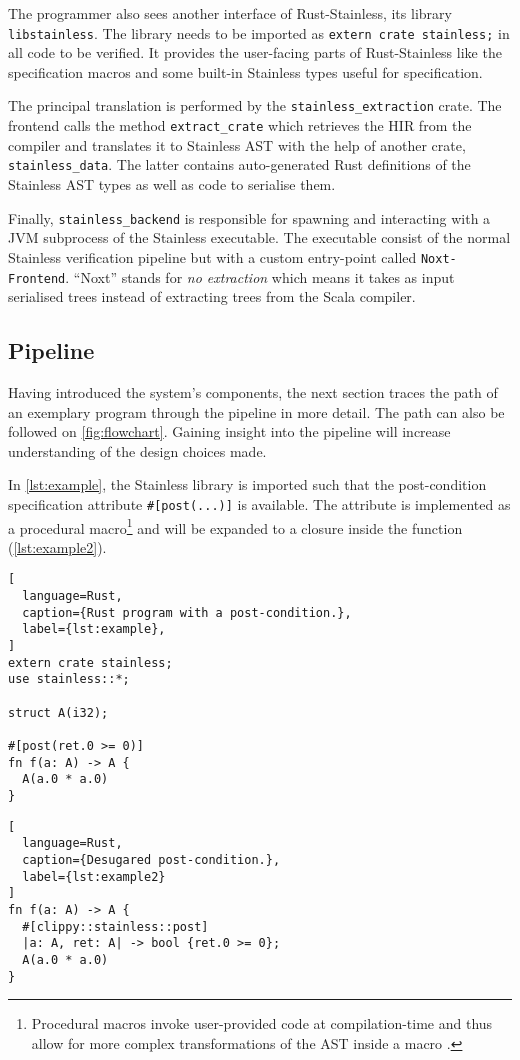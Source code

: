 The programmer also sees another interface of Rust-Stainless, its library
\lstinline!libstainless!. The library needs to be imported as
\passthrough{\lstinline!extern crate stainless;!} in all code to be verified. It
provides the user-facing parts of Rust-Stainless like the specification macros
and some built-in Stainless types useful for specification.

The principal translation is performed by the \lstinline!stainless_extraction!
crate. The frontend calls the method \lstinline!extract_crate! which retrieves
the HIR from the compiler and translates it to Stainless AST with the help of
another crate, \lstinline!stainless_data!. The latter contains auto-generated
Rust definitions of the Stainless AST types as well as code to serialise them.

Finally, \lstinline!stainless_backend! is responsible for spawning and
interacting with a JVM subprocess of the Stainless executable. The executable
consist of the normal Stainless verification pipeline but with a custom
entry-point called \lstinline!Noxt-Frontend!. ``Noxt'' stands for \emph{no
extraction} which means it takes as input serialised trees instead of extracting
trees from the Scala compiler.

\subsection{Pipeline}
\label{sec:pipeline}

Having introduced the system's components, the next section traces the path of
an exemplary program through the pipeline in more detail. The path can also be
followed on \autoref{fig:flowchart}. Gaining insight into the pipeline will
increase understanding of the design choices made.

In \autoref{lst:example}, the Stainless library is imported such that the
post-condition specification attribute \lstinline!#[post(...)]! is available.
The attribute is implemented as a procedural macro\footnote{Procedural macros
invoke user-provided code at compilation-time and thus allow for more complex
transformations of the AST inside a macro \cite[section ``Procedural
Macros'']{rustref}.} and will be expanded to a closure inside the function
(\autoref{lst:example2}).

\noindent\begin{minipage}[b]{.45\textwidth}
\begin{lstlisting}[
  language=Rust,
  caption={Rust program with a post-condition.},
  label={lst:example},
]
extern crate stainless;
use stainless::*;

struct A(i32);

#[post(ret.0 >= 0)]
fn f(a: A) -> A {
  A(a.0 * a.0)
}
\end{lstlisting}
\end{minipage}\hfill
\begin{minipage}[b]{.52\textwidth}
\begin{lstlisting}[
  language=Rust,
  caption={Desugared post-condition.},
  label={lst:example2}
]
fn f(a: A) -> A {
  #[clippy::stainless::post]
  |a: A, ret: A| -> bool {ret.0 >= 0};
  A(a.0 * a.0)
}
\end{lstlisting}
\end{minipage}

